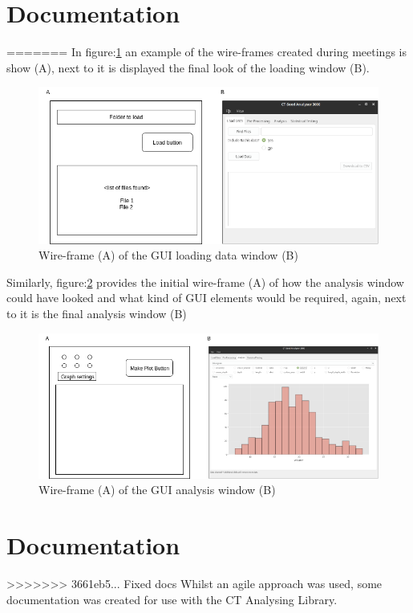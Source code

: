 \documentclass[11pt]{report}
\begin{document}
\section{Documentation}
\label{sec:orgbc99f8f}
=======
In figure:\ref{fig:orgce699ca} an example of the wire-frames created during meetings is show (A), next to it is displayed the final look of the loading window (B).
\begin{figure}[htbp]
\centering
\includegraphics[width=16cm]{./images/wireframe1.png}
\caption{\label{fig:orgce699ca}
Wire-frame (A) of the GUI loading data window (B)}
\end{figure}

Similarly, figure:\ref{fig:org1b16864} provides the initial wire-frame (A) of how the analysis window could have looked and what kind of GUI elements would be required, again, next to it is the final analysis window (B)
\begin{figure}[htbp]
\centering
\includegraphics[width=16cm]{./images/wireframe2.png}
\caption{\label{fig:org1b16864}
Wire-frame (A) of the GUI analysis window (B)}
\end{figure}
\section{Documentation}
\label{sec:orge738103}
>>>>>>> 3661eb5... Fixed docs
Whilst an agile approach was used, some documentation was created for use with the CT Analysing Library.
\end{document}

